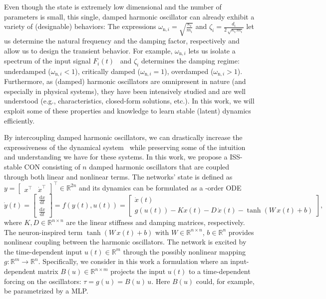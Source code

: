 Even though the state is extremely low dimensional and the number of parameters is small, this single, damped harmonic oscillator can already exhibit a variety of (designable) behaviors:
The expressions $\omega_{\mathrm{n},i} = \sqrt{\frac{\kappa_i}{m_i}}$ and $\zeta_i = \frac{d_i}{2 \, \sqrt{\kappa_i \, m_i}}$ let us determine the natural frequency and the damping factor, respectively and allow us to design the transient behavior. For example, $\omega_{\mathrm{n},i}$ lets us isolate a spectrum of the input signal $F_i(t)$~\citep{ceni2024random} and $\zeta_i$ determines the damping regime: underdamped ($\omega_{\mathrm{n},i} < 1$), critically damped ($\omega_{\mathrm{n},i} = 1$), overdamped ($\omega_{\mathrm{n},i} > 1$). 
Furthermore, as (damped) harmonic oscillators are omnipresent in nature (and especially in physical systems), they have been intensively studied and are well understood (e.g., characteristics, closed-form solutions, etc.). 
In this work, we will exploit some of these properties and knowledge to learn stable (latent) dynamics efficiently.

By intercoupling damped harmonic oscillators, we can drastically increase the expressiveness of the dynamical system~\citep{rusch2020coupled, ceni2024random, lanthaler2024neural} while preserving some of the intuition and understanding we have for these systems. In this work, we propose a \gls{ISS}-stable \gls{CON} consisting of $n$ damped harmonic oscillators that are coupled through both linear and nonlinear terms. The networks' state is defined as $y = \begin{bmatrix}
    x^\top & \dot{x}^\top
\end{bmatrix}^\top \in \mathbb{R}^{2n}$ and its dynamics can be formulated as a -order \gls{ODE}
\begin{equation}\label{eq:con:con_dynamics}
    \dot{y}(t) = \begin{bmatrix}
        \frac{\mathrm{d}x}{\mathrm{d}t}\\
        \frac{\mathrm{d}\dot{x}}{\mathrm{d}t}
    \end{bmatrix} = f(y(t), u(t)) = \begin{bmatrix}
        \dot{x}(t)\\
        g(u(t)) -K x(t) - D \, \dot{x}(t) - \tanh(W \, x(t) + b)
    \end{bmatrix},
\end{equation}
where $K, D \in \mathbb{R}^{n \times n}$ are the linear stiffness and damping matrices, respectively. The neuron-inspired term $\tanh(W \, x(t) + b)$ with $W \in \mathbb{R}^{n \times n}$, $b \in \mathbb{R}^n$ provides nonlinear coupling between the harmonic oscillators.
The network is excited by the time-dependent input $u(t) \in \mathbb{R}^m$ through the possibly nonlinear mapping $g: \mathbb{R}^m \to \mathbb{R}^n$.
Specifically, we consider in this work a formulation where an input-dependent matrix $B(u) \in \mathbb{R}^{n \times m}$ projects the input $u(t)$ to a time-dependent forcing on the oscillators: $\tau = g(u) = B(u) \, u$. Here $B(u)$ could, for example, be parametrized by a \gls{MLP}.


